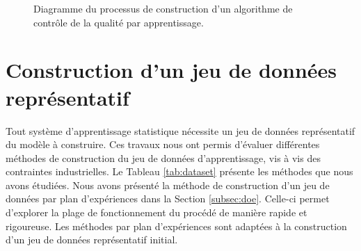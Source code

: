 \begin{figure}[hbtp]
	\caption{Diagramme du processus de construction d'un algorithme de contrôle de la qualité par apprentissage.}
	\label{fig:deep_flowchart}
\end{figure}

\vfill
\newpage

\section{Construction d'un jeu de données représentatif} \label{ch:dataset} \label{sec:dataset_construction}
Tout système d'apprentissage statistique nécessite un jeu de données représentatif du modèle à construire.
Ces travaux nous ont permis d'évaluer différentes méthodes de construction du jeu de données d'apprentissage, vis à vis des contraintes industrielles.
Le Tableau \ref{tab:dataset} présente les méthodes que nous avons étudiées.
Nous avons présenté la méthode de construction d'un jeu de données par plan d'expériences dans la Section \ref{subsec:doe}.
Celle-ci permet d'explorer la plage de fonctionnement du procédé de manière rapide et rigoureuse.
Les méthodes par plan d'expériences sont adaptées à la construction d'un jeu de données représentatif initial.

